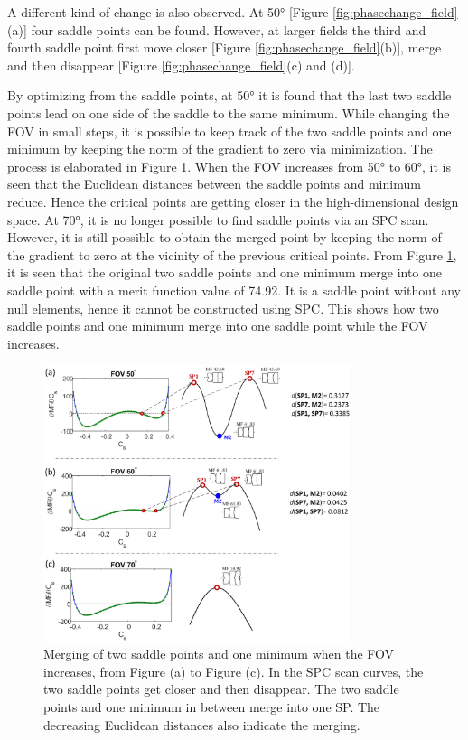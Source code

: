 A different kind of change is also observed. At 50° [Figure \ref{fig:phasechange_field}(a)] four saddle points can be found. However, at larger fields the third and fourth saddle point first move closer [Figure \ref{fig:phasechange_field}(b)], merge and then disappear [Figure \ref{fig:phasechange_field}(c) and (d)]. 

By optimizing from the saddle points, at 50° it is found that the last two saddle points lead on one side of the saddle to the same minimum. While changing the FOV in small steps, it is possible to keep track of the two saddle points and one minimum by keeping the norm of the gradient to zero via minimization. The process is elaborated in Figure \ref{fig:systemdie}. When the FOV increases from 50° to 60°, it is seen that the Euclidean distances between the saddle points and minimum reduce. Hence the critical points are getting closer in the high-dimensional design space. At 70°, it is no longer possible to find saddle points via an SPC scan. However, it is still possible to obtain the merged point by keeping the norm of the gradient to zero at the vicinity of the previous critical points. From Figure \ref{fig:systemdie}, it is seen that the original two saddle points and one minimum merge into one saddle point with a merit function value of 74.92. It is a saddle point without any null elements, hence it cannot be constructed using SPC. This shows how two saddle points and one minimum merge into one saddle point while the FOV increases. 

\begin{figure}[h!]
    \centering
    \includegraphics[width=0.8\textwidth]{chapter-3/figures/SystemDie.png}
    \caption{Merging of two saddle points and one minimum when the FOV increases, from Figure (a) to Figure (c). In the SPC scan curves, the two saddle points get closer and then disappear. The two saddle points and one minimum in between merge into one SP. The decreasing Euclidean distances also indicate the merging.}
    \label{fig:systemdie}
\end{figure}

